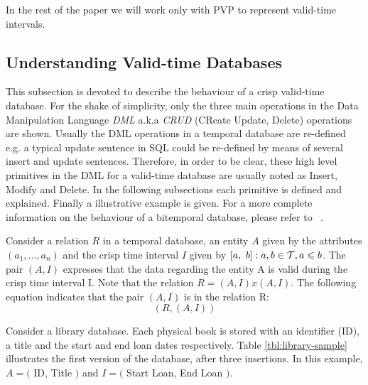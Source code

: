 In the rest of the paper we will work only with PVP to represent valid-time intervals.


\subsection{\label{subsubsec:Understanding-valid-time-databases}Understanding Valid-time Databases}
This subsection is devoted to describe the behaviour of a crisp valid-time database. For the shake of simplicity, only the three main operations in the Data Manipulation Language \emph{DML} a.k.a \emph{CRUD} (CReate Update, Delete) operations are shown. Usually the DML operations in a temporal database are re-defined e.g. a typical update sentence in SQL could be re-defined by means of several insert and update sentences. Therefore, in order to be clear, these high level primitives in the DML for a valid-time database are usually noted as Insert, Modify and Delete. In the following subsections each primitive is defined and explained. Finally a illustrative example is given. For a more complete information on the behaviour of a bitemporal database, please refer to ~\cite{Jensen1994}.

\begin{definition}
Consider a relation $R$ in a temporal database, an entity $A$ given by the attributes $\left(a_1, \ldots, a_n \right)$ and the crisp time interval $I$ given by $\left[a,\ b\right] : a,b \in \mathcal{T}, a \leqslant b$. The pair $\left(A, I\right)$ expresses that the data regarding the entity A is valid during the crisp time interval I.  Note that the relation $R = \left(A, I \right) x \left(A, I \right)$. The following equation indicates that the pair $\left(A, I\right)$ is in the relation R:
\begin{equation}
\label{eq:rel-def}
\left( R, \left(A , I\right) \right)
\end{equation}
\end{definition}
\begin{example}
\label{ex:library-database}
 Consider a library database. Each physical book is stored with an identifier (ID), a title and the start and end loan dates respectively. Table \ref{tbl:library-sample} illustrates the first version of the database, after three insertions. In this example, $A = ($ ID, Title $)$ and $I = ($ Start Loan, End Loan $)$.
\end{example}





